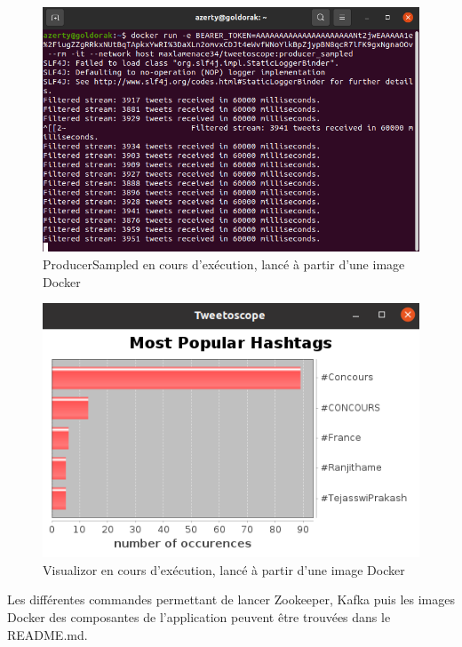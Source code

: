 \documentclass{article}
\begin{document}
\begin{figure}[htbp]
    \centering
    \includegraphics[scale=0.5]{images/ProducerSampled.png}
    \caption{ProducerSampled en cours d'exécution, lancé à partir d'une image Docker}
    \label{fig:1}
\end{figure}

\begin{figure}[htbp]
    \centering
    \includegraphics[scale=0.8]{images/Visualizor.png}
    \caption{Visualizor en cours d'exécution, lancé à partir d'une image Docker}
    \label{fig:2}
\end{figure}

Les différentes commandes permettant de lancer Zookeeper, Kafka puis les images Docker des composantes de l'application peuvent être trouvées dans le README.md. \\
\end{document}
